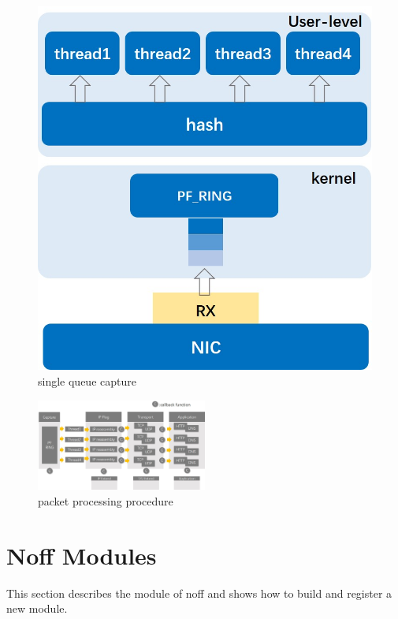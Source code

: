 \documentclass[conference]{IEEEtran}
\begin{document}
\begin{figure}
\begin{minipage}[t]{0.49\linewidth}
\includegraphics[width=\textwidth]{./picture/Figure2.jpg}
\caption{single queue capture}
\label{fig:2}
\end{minipage}
\end{figure} 

\begin{figure}[htbp]
  \centering
  \includegraphics[width=0.5\textwidth]{./picture/Figure3.jpg}
  \caption{packet processing procedure}
  \label{fig:3}
\end{figure}

\section{Noff Modules}
This section describes the module of noff and shows how to build and register a new module.
\end{document}
